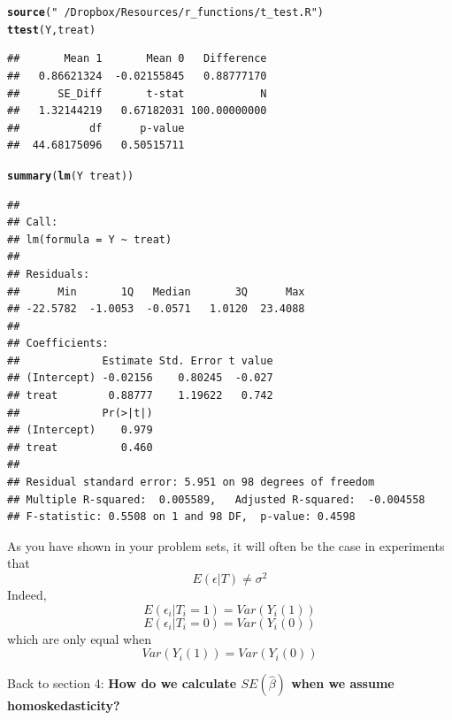 \documentclass[12 pt]{article}\usepackage[]{graphicx}\usepackage[]{color}
\makeatletter
\newcommand{\hlstr}[1]{\textcolor[rgb]{0.192,0.494,0.8}{#1}}%
\newcommand{\hlopt}[1]{\textcolor[rgb]{0,0,0}{#1}}%
\newcommand{\hlstd}[1]{\textcolor[rgb]{0.345,0.345,0.345}{#1}}%
\newcommand{\hlkwd}[1]{\textcolor[rgb]{0.737,0.353,0.396}{\textbf{#1}}}%
\newenvironment{kframe}{%
 \def\at@end@of@kframe{}%
 \ifinner\ifhmode%
  \def\at@end@of@kframe{\end{minipage}}%
  \begin{minipage}{\columnwidth}%
 \fi\fi%
 \def\FrameCommand##1{\hskip\@totalleftmargin \hskip-\fboxsep
 \colorbox{shadecolor}{##1}\hskip-\fboxsep
     \hskip-\linewidth \hskip-\@totalleftmargin \hskip\columnwidth}%
 \MakeFramed {\advance\hsize-\width
   \@totalleftmargin\z@ \linewidth\hsize
   \@setminipage}}%
 {\par\unskip\endMakeFramed%
 \at@end@of@kframe}
\newenvironment{knitrout}{}{} %
\makeatother
\begin{document}
\begin{knitrout}
\color{fgcolor}\begin{kframe}
\begin{alltt}
\hlkwd{source}\hlstd{(}\hlstr{"~/Dropbox/Resources/r_functions/t_test.R"}\hlstd{)}
\hlkwd{ttest}\hlstd{(Y, treat)}
\end{alltt}
\begin{verbatim}
##       Mean 1       Mean 0   Difference 
##   0.86621324  -0.02155845   0.88777170 
##      SE_Diff       t-stat            N 
##   1.32144219   0.67182031 100.00000000 
##           df      p-value 
##  44.68175096   0.50515711
\end{verbatim}
\begin{alltt}
\hlkwd{summary}\hlstd{(}\hlkwd{lm}\hlstd{(Y} \hlopt{~} \hlstd{treat))}
\end{alltt}
\begin{verbatim}
## 
## Call:
## lm(formula = Y ~ treat)
## 
## Residuals:
##      Min       1Q   Median       3Q      Max 
## -22.5782  -1.0053  -0.0571   1.0120  23.4088 
## 
## Coefficients:
##             Estimate Std. Error t value
## (Intercept) -0.02156    0.80245  -0.027
## treat        0.88777    1.19622   0.742
##             Pr(>|t|)
## (Intercept)    0.979
## treat          0.460
## 
## Residual standard error: 5.951 on 98 degrees of freedom
## Multiple R-squared:  0.005589,	Adjusted R-squared:  -0.004558 
## F-statistic: 0.5508 on 1 and 98 DF,  p-value: 0.4598
\end{verbatim}
\end{kframe}
\end{knitrout}


As you have shown in your problem sets, it will often be the case in experiments that 
$$E(\epsilon|T) \not= \sigma^2$$ 
Indeed,
$$E(\epsilon_i|T_i=1)=Var(Y_i(1))$$
$$E(\epsilon_i|T_i=0)=Var(Y_i(0))$$
which are only equal when $$Var(Y_i(1))=Var(Y_i(0))$$


Back to section 4: \textbf{How do we calculate $SE(\hat{\beta})$ when we assume homoskedasticity?}
\end{document}
